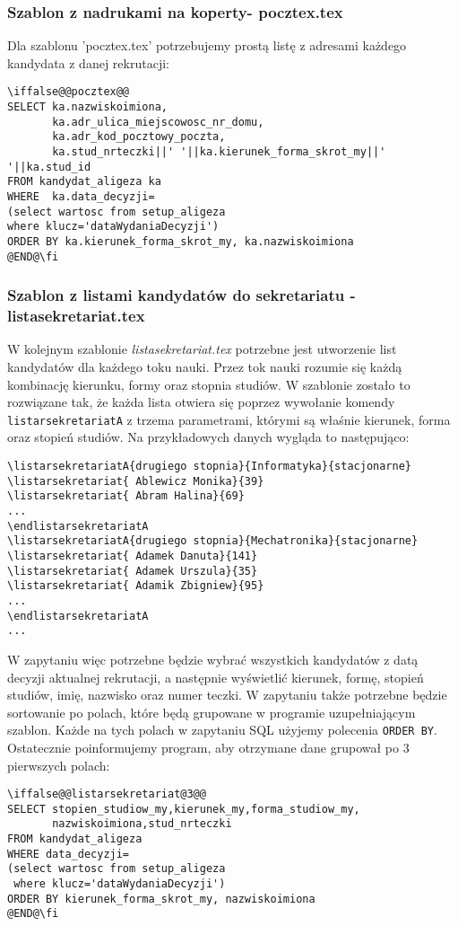 \subsubsection*{Szablon z nadrukami na koperty- pocztex.tex}
Dla szablonu 'pocztex.tex' potrzebujemy prostą listę z adresami każdego kandydata z danej rekrutacji:


 \begin{lstlisting}
\iffalse@@pocztex@@
SELECT ka.nazwiskoimiona,
       ka.adr_ulica_miejscowosc_nr_domu,
	   ka.adr_kod_pocztowy_poczta,
	   ka.stud_nrteczki||' '||ka.kierunek_forma_skrot_my||' '||ka.stud_id	   
FROM kandydat_aligeza ka 
WHERE  ka.data_decyzji=
(select wartosc from setup_aligeza 
where klucz='dataWydaniaDecyzji')
ORDER BY ka.kierunek_forma_skrot_my, ka.nazwiskoimiona
@END@\fi
\end{lstlisting}

\subsubsection*{Szablon z listami kandydatów do sekretariatu - listasekretariat.tex}
W kolejnym szablonie \emph{listasekretariat.tex} potrzebne jest utworzenie list kandydatów dla każdego toku nauki. Przez tok nauki rozumie się każdą kombinację kierunku, formy oraz stopnia studiów. W szablonie zostało to rozwiązane tak, że każda lista otwiera się poprzez wywołanie komendy \texttt{listarsekretariatA} z trzema parametrami, którymi są właśnie kierunek, forma oraz stopień studiów. Na przykładowych danych wygląda to następująco:
 \begin{lstlisting}
\listarsekretariatA{drugiego stopnia}{Informatyka}{stacjonarne}
\listarsekretariat{ Ablewicz Monika}{39}
\listarsekretariat{ Abram Halina}{69}
...
\endlistarsekretariatA
\listarsekretariatA{drugiego stopnia}{Mechatronika}{stacjonarne}
\listarsekretariat{ Adamek Danuta}{141}
\listarsekretariat{ Adamek Urszula}{35}
\listarsekretariat{ Adamik Zbigniew}{95}
...
\endlistarsekretariatA
...
\end{lstlisting}

W zapytaniu więc potrzebne będzie wybrać wszystkich kandydatów z datą decyzji aktualnej rekrutacji, a następnie wyświetlić kierunek, formę, stopień studiów, imię, nazwisko oraz numer teczki. W zapytaniu także potrzebne będzie sortowanie po polach, które będą grupowane w programie uzupełniającym szablon. Każde na tych polach w zapytaniu SQL użyjemy polecenia \texttt{ORDER BY}. Ostatecznie poinformujemy program, aby otrzymane dane grupował po 3 pierwszych polach:
 \begin{lstlisting}
\iffalse@@listarsekretariat@3@@
SELECT stopien_studiow_my,kierunek_my,forma_studiow_my,
       nazwiskoimiona,stud_nrteczki
FROM kandydat_aligeza
WHERE data_decyzji=
(select wartosc from setup_aligeza
 where klucz='dataWydaniaDecyzji')
ORDER BY kierunek_forma_skrot_my, nazwiskoimiona
@END@\fi
\end{lstlisting}

